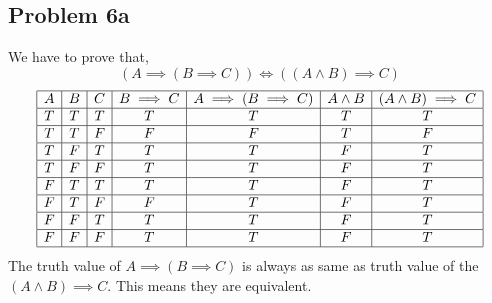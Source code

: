 \documentclass[answers]{exam}
\theoremstyle{mytheoremstyle}
\theoremstyle{mytheoremstyle}
\theoremstyle{myproblemstyle}
\begin{document}
\subsection*{Problem 6a}
\begin{framed}
    We have to prove that,
    \[(A\implies(B\implies C))\iff ((A\land B)\implies C)\]
    \begin{displaymath}
        \begin{array}{|c|c|c|c|c|c|c|}
            \hline
            A & B & C & B\implies C & A\implies(B\implies C) & A\land B & (A\land B)\implies C \\\hline
            T & T & T & T           & T                      & T        & T                    \\\hline
            T & T & F & F           & F                      & T        & F                    \\\hline
            T & F & T & T           & T                      & F        & T                    \\\hline
            T & F & F & T           & T                      & F        & T                    \\\hline
            F & T & T & T           & T                      & F        & T                    \\\hline
            F & T & F & F           & T                      & F        & T                    \\\hline
            F & F & T & T           & T                      & F        & T                    \\\hline
            F & F & F & T           & T                      & F        & T                    \\\hline
        \end{array}
    \end{displaymath}
    The truth value of \(A\implies(B\implies C)\) is always as same as truth value of the \((A\land B)\implies C\). This means they are equivalent.
\end{framed}
\end{document}
